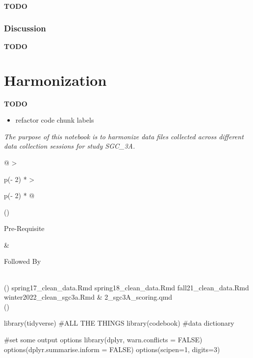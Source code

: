 \documentclass[
  letterpaper,
  DIV=11,
  numbers=noendperiod]{scrreprt}
\newenvironment{Shaded}{\begin{snugshade}}{\end{snugshade}}
\newcommand{\AttributeTok}[1]{\textcolor[rgb]{0.40,0.45,0.13}{#1}}
\newcommand{\CommentTok}[1]{\textcolor[rgb]{0.37,0.37,0.37}{#1}}
\newcommand{\ConstantTok}[1]{\textcolor[rgb]{0.56,0.35,0.01}{#1}}
\newcommand{\DecValTok}[1]{\textcolor[rgb]{0.68,0.00,0.00}{#1}}
\newcommand{\FunctionTok}[1]{\textcolor[rgb]{0.28,0.35,0.67}{#1}}
\newcommand{\NormalTok}[1]{\textcolor[rgb]{0.00,0.23,0.31}{#1}}
\providecommand{\tightlist}{%
  \setlength{\itemsep}{0pt}\setlength{\parskip}{0pt}}\usepackage{longtable,booktabs,array}
\begin{document}
\textbf{TODO}

\hypertarget{discussion}{%
\subsection*{Discussion}\label{discussion}}

\textbf{TODO}

\newpage

\hypertarget{sec-SGC3A-harmonize}{%
\chapter{Harmonization}\label{sec-SGC3A-harmonize}}

\textbf{TODO}

\begin{itemize}
\tightlist
\item
  refactor code chunk labels
\end{itemize}

\emph{The purpose of this notebook is to harmonize data files collected
across different data collection sessions for study SGC\_3A.}

\begin{longtable}[]{@{}
  >{\raggedright\arraybackslash}p{(\columnwidth - 2\tabcolsep) * }
  >{\raggedright\arraybackslash}p{(\columnwidth - 2\tabcolsep) * }@{}}
\toprule()
\begin{minipage}[b]{\linewidth}\raggedright
Pre-Requisite
\end{minipage} & \begin{minipage}[b]{\linewidth}\raggedright
Followed By
\end{minipage} \\
\midrule()
\endhead
spring17\_clean\_data.Rmd spring18\_clean\_data.Rmd
fall21\_clean\_data.Rmd winter2022\_clean\_sgc3a.Rmd &
2\_sgc3A\_scoring.qmd \\
\bottomrule()
\end{longtable}

\begin{Shaded}
\begin{Highlighting}[]
\FunctionTok{library}\NormalTok{(tidyverse) }\CommentTok{\#ALL THE THINGS}
\FunctionTok{library}\NormalTok{(codebook) }\CommentTok{\#data dictionary}

\CommentTok{\#set some output options}
\FunctionTok{library}\NormalTok{(dplyr, }\AttributeTok{warn.conflicts =} \ConstantTok{FALSE}\NormalTok{)}
\FunctionTok{options}\NormalTok{(}\AttributeTok{dplyr.summarise.inform =} \ConstantTok{FALSE}\NormalTok{)}
\FunctionTok{options}\NormalTok{(}\AttributeTok{scipen=}\DecValTok{1}\NormalTok{, }\AttributeTok{digits=}\DecValTok{3}\NormalTok{)}
\end{Highlighting}
\end{Shaded}
\end{document}
